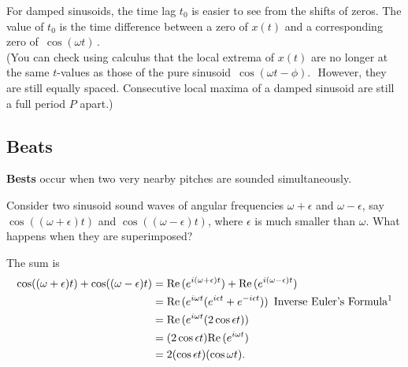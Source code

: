 For damped sinusoids, the time lag $t_0$ is easier to see from the shifts of zeros.
The value of $t_0$ is the time difference between a zero of $x(t)$ and a corresponding
zero of $\, \cos (\omega t)\,$.\\

(You can check using calculus that the local extrema of $x(t)$ are no longer
at the same $t$-values as those of the pure sinusoid $\, \cos \left(\omega t -\phi \right).\, \,$
However, they are still equally spaced.
Consecutive local maxima of a damped sinusoid are still a full period $P$ apart.)\\
\clearpage

\subsection{Beats}

\textbf{\color{blue} Bests} occur when two very nearby pitches are sounded simultaneously.\\

\begin{problem}
  Consider two sinusoid sound waves of angular frequencies $\omega +\epsilon$ and
  $\omega -\epsilon$, say $\cos ((\omega +\epsilon )t)$ and $\cos ((\omega -\epsilon )t)$,
  where $\epsilon$ is much smaller than $\omega$.
  What happens when they are superimposed? 
\end{problem}

\Solution The sum is 
\begin{align*}
  \displaystyle  \cos ((\omega +\epsilon )t) + \cos ((\omega -\epsilon )t)
  \displaystyle &= \mathrm{Re\, }(e^{i(\omega +\epsilon ) t}) + \mathrm{Re\, }(e^{i(\omega -\epsilon ) t}) \\
  \displaystyle &= \mathrm{Re\, }(e^{i\omega t} (e^{i \epsilon t} + e^{-i\epsilon t})) \,
  \text{ Inverse Euler's Formula\footnotemark}\\
  \displaystyle &= \mathrm{Re\, }(e^{i\omega t} (2 \cos \epsilon t))  \\
  \displaystyle &= (2 \cos \epsilon t) \mathrm{Re\, }(e^{i\omega t}) \\
  \displaystyle &= 2 (\cos \epsilon t) (\cos \omega t).
\end{align*}

